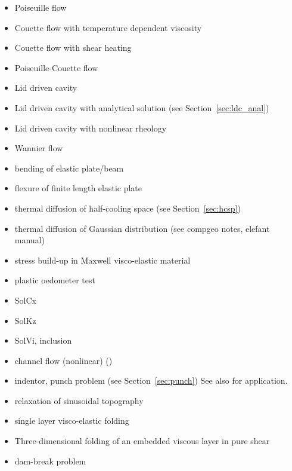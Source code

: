 \begin{itemize}
\item Poiseuille flow \cite{fojg94,fuku11,tagm09}
\item Couette flow with temperature dependent viscosity \cite{egat10,demh19}
\item Couette flow with shear heating \cite{egat10}
\item Poiseuille-Couette flow \cite{fusc13}
\item Lid driven cavity \cite{kawa61,shry78,foth79,ghgs82,bope98,kawa61,brsa06,kost84,ertu09}
\item Lid driven cavity with analytical solution (see Section~\ref{sec:ldc_anal})
\item Lid driven cavity with nonlinear rheology \cite{been80,svna18}
\item Wannier flow \cite{wann50,yemu99,cehg14}
\item bending of elastic plate/beam \cite{cehg14,boht08a,vosc15,egat10,demh19,modm02,litu02}
\item flexure of finite length elastic plate \cite{chtl13}
\item thermal diffusion of half-cooling space (see Section~\ref{sec:hcsp}) 
\item thermal diffusion of Gaussian distribution (see compgeo notes, elefant manual)
\item stress build-up in Maxwell visco-elastic material \cite{geyu07,chtl13,egat10,demh19}
\item plastic oedometer test  \cite{chtl13}
\item SolCx \cite{mamo08,demh19,aspectmanual}
\item SolKz \cite{mamo08,demh19,aspectmanual}
\item SolVi, inclusion \cite{scpo03,kapo06,maie12,deka08,bepo10,sunh10,vosc15,demh19,aspectmanual,litu02}
\item channel flow (nonlinear) \cite{maie12,frbt19,gery10,egat10} (\bscthesis) 
\item indentor, punch problem (see Section~\ref{sec:punch})
      See also \cite{hukm03,fojd04,gerb12} for application.
\item relaxation of sinusoidal topography \cite{crsg12,robh17}
\item single layer visco-elastic folding \cite{scps01,vosc15}
\item Three-dimensional folding of an embedded viscous layer in pure shear \cite{flet91}
\item dam-break problem \cite{moeb99,bacp07,liir07,lemx08,homa09,anco09,grdn97,hini81,basd08}

\end{itemize}
